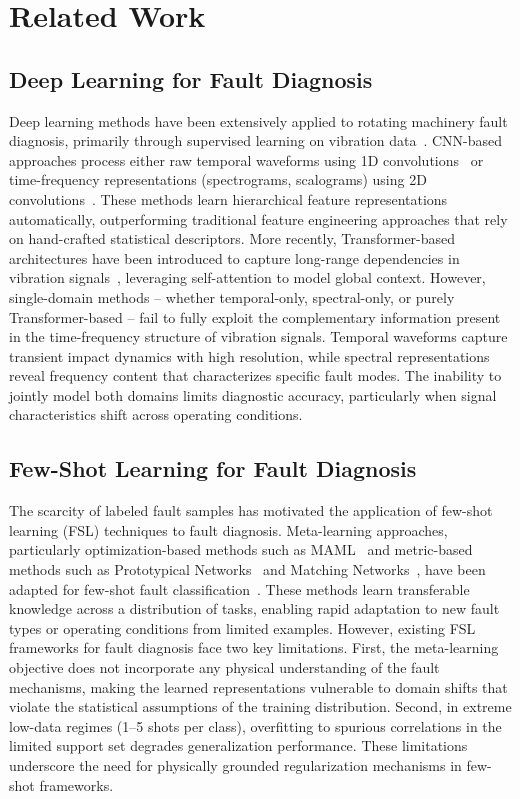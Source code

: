 \section{Related Work}
\label{sec:related}

\subsection{Deep Learning for Fault Diagnosis}

Deep learning methods have been extensively applied to rotating machinery fault diagnosis, primarily through supervised learning on vibration data~\cite{wang2019deep,zhang2020convolutional}. CNN-based approaches process either raw temporal waveforms using 1D convolutions~\cite{inoue2018cnn} or time-frequency representations (spectrograms, scalograms) using 2D convolutions~\cite{wen2018new}. These methods learn hierarchical feature representations automatically, outperforming traditional feature engineering approaches that rely on hand-crafted statistical descriptors. More recently, Transformer-based architectures have been introduced to capture long-range dependencies in vibration signals~\cite{ding2022transformer}, leveraging self-attention to model global context. However, single-domain methods -- whether temporal-only, spectral-only, or purely Transformer-based -- fail to fully exploit the complementary information present in the time-frequency structure of vibration signals. Temporal waveforms capture transient impact dynamics with high resolution, while spectral representations reveal frequency content that characterizes specific fault modes. The inability to jointly model both domains limits diagnostic accuracy, particularly when signal characteristics shift across operating conditions.

\subsection{Few-Shot Learning for Fault Diagnosis}

The scarcity of labeled fault samples has motivated the application of few-shot learning (FSL) techniques to fault diagnosis. Meta-learning approaches, particularly optimization-based methods such as MAML~\cite{finn2017maml} and metric-based methods such as Prototypical Networks~\cite{snell2017prototypical} and Matching Networks~\cite{vinyals2016matching}, have been adapted for few-shot fault classification~\cite{li2021meta,sun2022multi}. These methods learn transferable knowledge across a distribution of tasks, enabling rapid adaptation to new fault types or operating conditions from limited examples. However, existing FSL frameworks for fault diagnosis face two key limitations. First, the meta-learning objective does not incorporate any physical understanding of the fault mechanisms, making the learned representations vulnerable to domain shifts that violate the statistical assumptions of the training distribution. Second, in extreme low-data regimes (1--5 shots per class), overfitting to spurious correlations in the limited support set degrades generalization performance. These limitations underscore the need for physically grounded regularization mechanisms in few-shot frameworks.

